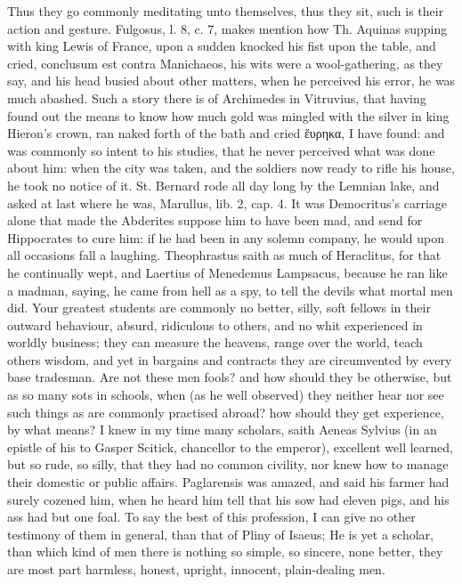{Thus they go commonly meditating unto themselves, thus they sit, such
is their action and gesture. Fulgosus, l. 8, c. 7, makes mention how
Th. Aquinas supping with king Lewis of France, upon a sudden knocked
his fist upon the table, and cried, conclusum est contra Manichaeos,
his wits were a wool-gathering, as they say, and his head busied about
other matters, when he perceived his error, he was much abashed.
Such a story there is of Archimedes in Vitruvius, that having found out
the means to know how much gold was mingled with the silver in king
Hieron's crown, ran naked forth of the bath and cried ἕυρηκα, I have
found: and was commonly so intent to his studies, that he never
perceived what was done about him: when the city was taken, and the
soldiers now ready to rifle his house, he took no notice of it. St.
Bernard rode all day long by the Lemnian lake, and asked at last where
he was, Marullus, lib. 2, cap. 4. It was Democritus's carriage alone
that made the Abderites suppose him to have been mad, and send for
Hippocrates to cure him: if he had been in any solemn company, he would
upon all occasions fall a laughing. Theophrastus saith as much of
Heraclitus, for that he continually wept, and Laertius of Menedemus
Lampsacus, because he ran like a madman, saying, he came from
hell as a spy, to tell the devils what mortal men did. Your greatest
students are commonly no better, silly, soft fellows in their outward
behaviour, absurd, ridiculous to others, and no whit experienced in
worldly business; they can measure the heavens, range over the world,
teach others wisdom, and yet in bargains and contracts they are
circumvented by every base tradesman. Are not these men fools? and how
should they be otherwise, but as so many sots in schools, when (as
he well observed) they neither hear nor see such things as are
commonly practised abroad? how should they get experience, by what
means? I knew in my time many scholars, saith Aeneas Sylvius (in
an epistle of his to Gasper Scitick, chancellor to the emperor),
excellent well learned, but so rude, so silly, that they had no common
civility, nor knew how to manage their domestic or public affairs.
Paglarensis was amazed, and said his farmer had surely cozened him,
when he heard him tell that his sow had eleven pigs, and his ass had
but one foal. To say the best of this profession, I can give no other
testimony of them in general, than that of Pliny of Isaeus; He is
yet a scholar, than which kind of men there is nothing so simple, so
sincere, none better, they are most part harmless, honest, upright,
innocent, plain-dealing men.

}
